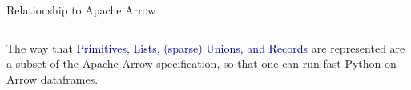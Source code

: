 \documentclass[aspectratio=169]{beamer}
\begin{document}








\begin{frame}{Relationship to Apache Arrow}
\large

\begin{columns}
\begin{center}
The way that \textcolor{darkblue}{Primitives, Lists, (sparse) Unions, and Records} are represented are a subset of the Apache Arrow specification, so that one can run fast Python on Arrow dataframes.

\vspace{0.75 cm}
\end{center}
\end{columns}
\end{frame}
\end{document}
